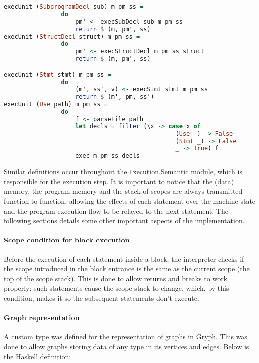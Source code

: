 \begin{lstlisting}[language=Haskell, basicstyle=\footnotesize]
execUnit (SubprogramDecl sub) m pm ss = 
                do 
                    pm' <- execSubDecl sub m pm ss
                    return $ (m, pm', ss)
execUnit (StructDecl struct) m pm ss = 
                do
                    pm' <- execStructDecl m pm ss struct
                    return $ (m, pm', ss)

execUnit (Stmt stmt) m pm ss = 
                do 
                    (m', ss', v) <- execStmt stmt m pm ss
                    return $ (m', pm, ss')
execUnit (Use path) m pm ss = 
                do
                    f <- parseFile path
                    let decls = filter (\x -> case x of    
                                                (Use _) -> False
                                                (Stmt _) -> False
                                                _ -> True) f
                    exec m pm ss decls
\end{lstlisting}

Similar definitions occur throughout the {\texttt Execution.Semantic} module, 
which is responsible for the execution step. It is important to notice that the (data) memory, the program memory and the stack of scopes are always transmitted function to function, allowing the effects of each statement over the machine state and the program execution flow to be relayed to the next statement. The following sections details some other important aspects of the implementation.

\paragraph{Scope condition for block execution}

Before the execution of each statement inside a block, the interpreter checks if
the scope introduced in the block entrance is the same as the
current scope (the top of the scope stack). This is done to
allow returns and breaks to work properly: such statements
cause the scope stack to change, which, by this condition, 
makes it so the subsequent statements don't execute.

\paragraph{Graph representation}

A custom type was defined for the representation of graphs in Gryph. 
This was done to allow graphs storing data of any type in its vertices and
edges. Below is the Haskell definition:

